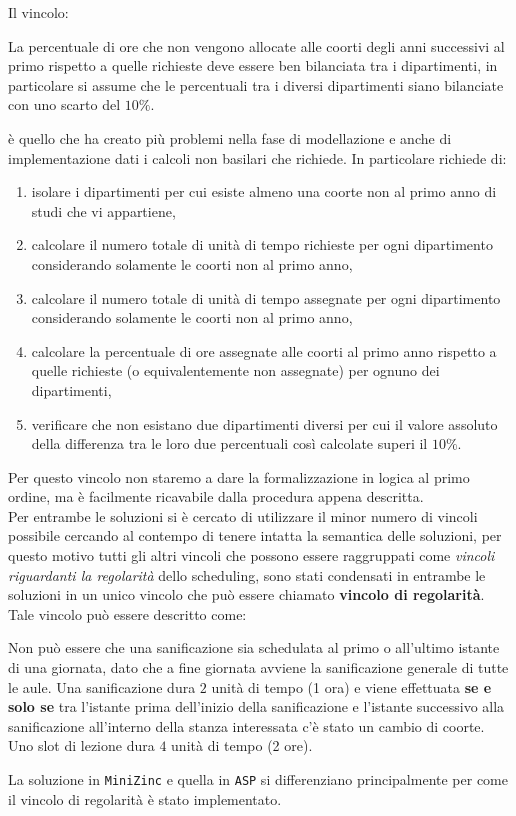 \documentclass[12pt,english, openany]{book}
\begin{document}
Il vincolo:
\begin{tcolorbox}[title=\textbf{Vincolo bilanciamento insoddisfazione dipartimenti}]
La percentuale di ore che non vengono allocate alle coorti degli anni successivi al primo rispetto a quelle richieste deve essere ben bilanciata tra i dipartimenti, in particolare si assume che le percentuali tra i diversi dipartimenti siano bilanciate con uno scarto del $10 \% $.
\end{tcolorbox}
è quello che ha creato più problemi nella fase di modellazione e anche di implementazione dati i calcoli non basilari che richiede.
In particolare richiede di:
\begin{enumerate}
\item isolare i dipartimenti per cui esiste almeno una coorte non al primo anno di studi che vi appartiene,
\item calcolare il numero totale di unità di tempo richieste per ogni dipartimento considerando solamente le coorti non al primo anno,
\item calcolare il numero totale di unità di tempo assegnate per ogni dipartimento considerando solamente le coorti non al primo anno,
\item calcolare la percentuale di ore assegnate alle coorti al primo anno rispetto a quelle richieste (o equivalentemente non assegnate) per ognuno dei dipartimenti,
\item verificare che non esistano due dipartimenti diversi per cui il valore assoluto della differenza tra le loro due percentuali così calcolate superi il $10 \%$.
\end{enumerate}
Per questo vincolo non staremo a dare la formalizzazione in logica al primo ordine, ma è facilmente ricavabile dalla procedura appena descritta.\\

Per entrambe le soluzioni si è cercato di utilizzare il minor numero di vincoli possibile cercando al contempo di tenere intatta la semantica delle soluzioni, per questo motivo tutti gli altri vincoli che possono essere raggruppati come \textit{vincoli riguardanti la regolarità} dello scheduling, sono stati condensati in entrambe le soluzioni in un unico vincolo che può essere chiamato \textbf{vincolo di regolarità}.
Tale vincolo può essere descritto come:
\begin{tcolorbox}[title=\textbf{Vincolo di regolarità}]
Non può essere che una sanificazione sia schedulata al primo o all'ultimo istante di una giornata, dato che a fine giornata avviene la sanificazione generale di tutte le aule. Una sanificazione dura $2$ unità di tempo (1 ora) e viene effettuata \textbf{se e solo se} tra l'istante prima dell'inizio della sanificazione e l'istante successivo alla sanificazione all'interno della stanza interessata c'è stato un cambio di coorte. Uno slot di lezione dura $4$ unità di tempo (2 ore).
\end{tcolorbox}
La soluzione in \texttt{MiniZinc} e quella in \texttt{ASP} si differenziano principalmente per come il vincolo di regolarità è stato implementato.
\end{document}
